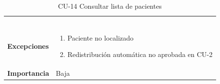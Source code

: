 \begin{table}[p]
\begin{tabularx}{\linewidth}{ p{} p{} }
\begin{enumerate}
		\end{enumerate}\\
		\textbf{Excepciones}          & 
        \begin{enumerate}
			\def\labelenumi{\arabic{enumi}.}
			\tightlist
			\item Paciente no localizado
			\item Redistribución automática no aprobada en CU-2
		\end{enumerate}\\
		\textbf{Importancia}          & Baja \\
		\bottomrule
	\end{tabularx}
	\caption{CU-14 Consultar lista de pacientes}
    \label{CU-14}
\end{table}

